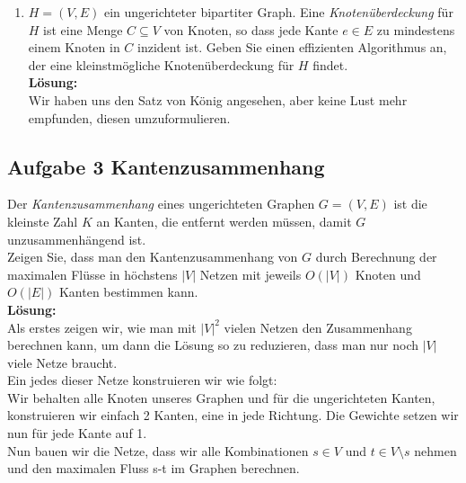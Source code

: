 \documentclass[11pt,a4paper,ngerman]{article}
\begin{document}
\begin{enumerate}[\bfseries a)]
\item $H = \left( V, E \right)$ ein ungerichteter bipartiter Graph. Eine \emph{Knotenüberdeckung} für $H$ ist eine Menge $C \subseteq V$ von Knoten, so dass jede Kante $e \in E$ zu mindestens einem Knoten in $C$ inzident ist. Geben Sie einen effizienten Algorithmus an, der eine kleinstmögliche Knotenüberdeckung für $H$ findet.\\

\textbf{Lösung:}\\

Wir haben uns den Satz von König angesehen, aber keine Lust mehr empfunden, diesen umzuformulieren.


\end{enumerate}

\subsection*{Aufgabe 3 \mdseries Kantenzusammenhang}

Der \emph{Kantenzusammenhang } eines ungerichteten Graphen $G = (V , E)$ ist die kleinste Zahl $K$ an Kanten, die entfernt werden müssen, damit $G$ unzusammenhängend ist.\\

Zeigen Sie, dass man den Kantenzusammenhang von $G$ durch Berechnung der maximalen Flüsse in höchstens $|V|$ Netzen mit jeweils $O(|V|)$ Knoten und $O(|E|)$ Kanten bestimmen kann.\\

\textbf{Lösung:}\\

Als erstes zeigen wir, wie man mit $|V|^2$ vielen Netzen den Zusammenhang berechnen kann, um dann die Lösung so zu reduzieren, dass man nur noch $|V|$ viele Netze braucht.\\

Ein jedes dieser Netze konstruieren wir wie folgt:\\
Wir behalten alle Knoten unseres Graphen und für die ungerichteten Kanten, konstruieren wir einfach 2 Kanten, eine in jede Richtung. Die Gewichte setzen wir nun für jede Kante auf 1.\\

Nun bauen wir die Netze, dass wir alle Kombinationen $s\in V$ und $t \in V \setminus{s}$ nehmen und den maximalen Fluss s-t im Graphen berechnen.\\
\end{document}
